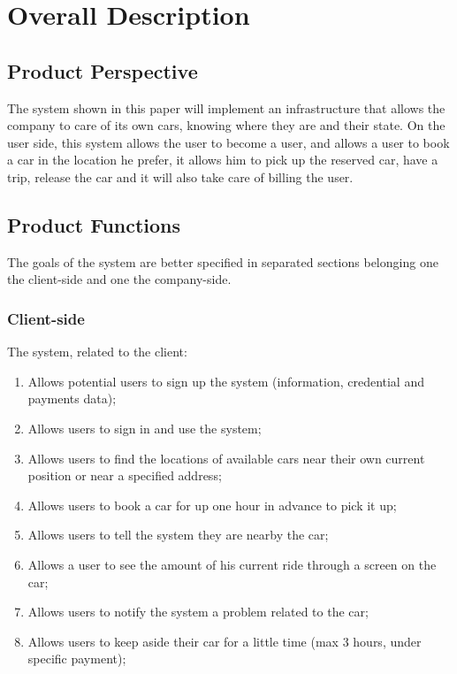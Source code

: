 \documentclass{scrreprt}
\begin{document}
\chapter{Overall Description}

\section{Product Perspective}
The system shown in this paper will implement an infrastructure that allows the company to care of its own cars, knowing where they are and their state. On the user side, this system allows the user to become a user, and allows a user to book a car in the location he prefer, it allows him to pick up the reserved car, have a trip, release the car and it will also take care of billing the user.
\begin{comment}$<$Describe the context and origin of the product being specified in this SRS.  
For example, state whether this product is a follow-on member of a product 
family, a replacement for certain existing systems, or a new, self-contained 
product. If the SRS defines a component of a larger system, relate the 
requirements of the larger system to the functionality of this software and 
identify interfaces between the two. A simple diagram that shows the major 
components of the overall system, subsystem interconnections, and external 
interfaces can be helpful.$>$
\end{comment}

\section{Product Functions}
The goals of the system are better specified in separated sections belonging one the client-side and one the company-side.
\subsection{Client-side}
The system, related to the client:
\begin{enumerate} [label=G\arabic*., start=1]
\item Allows potential users to sign up the system (information, credential and payments data); 
\item Allows users to sign in and use the system;
\item Allows users to find the locations of available cars near their own current position or near a specified address;
\item Allows users to book a car for up one hour in advance to pick it up;
\item Allows users to tell the system they are nearby the car;
\item Allows a user to see the amount of his current ride through a screen on the car;
\item Allows users to notify the system a problem related to the car;
\item Allows users to keep aside their car for a little time (max 3 hours, under specific payment);
\end{enumerate}
\end{document}
